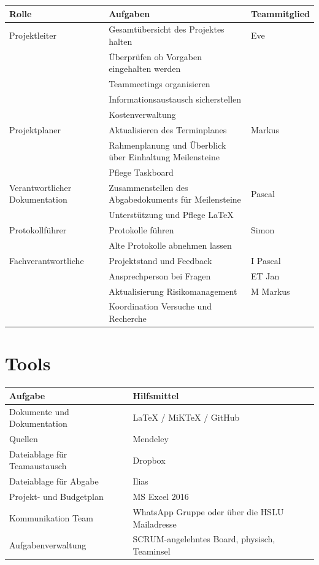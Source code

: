 \documentclass[a4paper]{report}
\begin{document}
\begin{tabular}{|p{}|p{}|p{}|}
	\hline
	\textbf{Rolle} & \textbf{Aufgaben} & \textbf{Teammitglied} \\
	\hline
	Projektleiter & Gesamtübersicht des Projektes halten  & Eve \\
	& Überprüfen ob Vorgaben eingehalten werden & \\
	& Teammeetings organisieren & \\
	& Informationsaustausch sicherstellen & \\
	& Kostenverwaltung & \\
	\hline
	Projektplaner & Aktualisieren des Terminplanes & Markus\\
	& Rahmenplanung und Überblick über Einhaltung Meilensteine& \\
	& Pflege Taskboard & \\
	\hline
	Verantwortlicher Dokumentation& Zusammenstellen des Abgabedokuments für Meilensteine & Pascal \\
	& Unterstützung und Pflege LaTeX &  \\
	\hline
	Protokollführer & Protokolle führen & Simon \\
	& Alte Protokolle abnehmen lassen & \\
	\hline
	Fachverantwortliche & Projektstand und Feedback & I Pascal \\
	& Ansprechperson bei Fragen & ET Jan\\
	& Aktualisierung Risikomanagement & M Markus\\
	& Koordination Versuche und Recherche & \\
	\hline
\end{tabular}

\section{Tools}
\begin{tabular}{|p{}|p{}|}
	\hline
	\textbf{Aufgabe} & \textbf{Hilfsmittel} \\
	\hline
	Dokumente und Dokumentation & LaTeX / MiKTeX / GitHub \\
	\hline
	Quellen & Mendeley \\
	\hline
	Dateiablage für Teamaustausch & Dropbox \\
	\hline
	Dateiablage für Abgabe & Ilias \\
	\hline
	Projekt- und Budgetplan & MS Excel 2016 \\
	\hline
	Kommunikation Team & WhatsApp Gruppe oder über die HSLU Mailadresse\\
	\hline
	Aufgabenverwaltung & SCRUM-angelehntes Board, physisch, Teaminsel\\
	\hline
\end{tabular}
\end{document}
